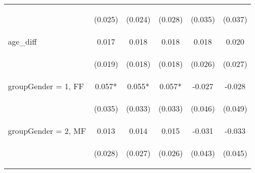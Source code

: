 \begin{center}
\begin{tabular}{lccccc}
\vspace{4pt} & \begin{footnotesize}(0.025)\end{footnotesize} & \begin{footnotesize}(0.024)\end{footnotesize} & \begin{footnotesize}(0.028)\end{footnotesize} & \begin{footnotesize}(0.035)\end{footnotesize} & \begin{footnotesize}(0.037)\end{footnotesize} \\
age\_diff & 0.017 & 0.018 & 0.018 & 0.018 & 0.020 \\
\vspace{4pt} & \begin{footnotesize}(0.019)\end{footnotesize} & \begin{footnotesize}(0.018)\end{footnotesize} & \begin{footnotesize}(0.018)\end{footnotesize} & \begin{footnotesize}(0.026)\end{footnotesize} & \begin{footnotesize}(0.027)\end{footnotesize} \\
groupGender = 1, FF & 0.057* & 0.055* & 0.057* & -0.027 & -0.028 \\
\vspace{4pt} & \begin{footnotesize}(0.035)\end{footnotesize} & \begin{footnotesize}(0.033)\end{footnotesize} & \begin{footnotesize}(0.033)\end{footnotesize} & \begin{footnotesize}(0.046)\end{footnotesize} & \begin{footnotesize}(0.049)\end{footnotesize} \\
groupGender = 2, MF & 0.013 & 0.014 & 0.015 & -0.031 & -0.033 \\
\vspace{4pt} & \begin{footnotesize}(0.028)\end{footnotesize} & \begin{footnotesize}(0.027)\end{footnotesize} & \begin{footnotesize}(0.026)\end{footnotesize} & \begin{footnotesize}(0.043)\end{footnotesize} & \begin{footnotesize}(0.045)\end{footnotesize} \\

\end{tabular}
\end{center}
